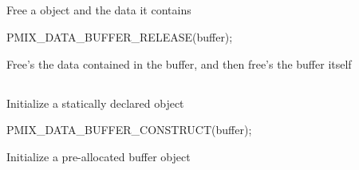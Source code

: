 \subsection{}

\summary

Free a  object and the data it contains

\format

\cspecificstart
\begin{codepar}
PMIX_DATA_BUFFER_RELEASE(buffer);
\end{codepar}
\cspecificend

\begin{arglist}
\end{arglist}

\descr

Free's the data contained in the buffer, and then free's the buffer itself


\subsection{}

\summary

Initialize a statically declared  object

\format

\cspecificstart
\begin{codepar}
PMIX_DATA_BUFFER_CONSTRUCT(buffer);
\end{codepar}
\cspecificend

\begin{arglist}
\end{arglist}

\descr

Initialize a pre-allocated buffer object


\subsection{}

\summary

